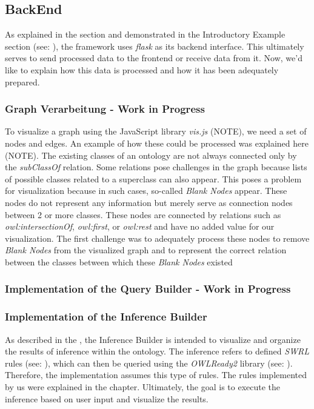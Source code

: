\subsection{BackEnd}

As explained in the  section and demonstrated in the Introductory Example section (see: ), the framework uses \textit{flask} as its backend interface. 
This ultimately serves to send processed data to the frontend or receive data from it. Now, we'd like to explain how this data is processed and how it has been adequately prepared.
\subsubsection{Graph Verarbeitung - Work in Progress}

To visualize a graph using the JavaScript library \textit{vis.js} (NOTE), we need a set of nodes and edges. An example of how these could be processed was explained here (NOTE). The existing classes of an ontology are not always connected only by the \textit{subClassOf} relation. Some relations pose challenges in the graph because lists of possible classes related to a superclass can also appear. This poses a problem for visualization because in such cases, so-called \textit{Blank Nodes} appear. These nodes do not represent any information but merely serve as connection nodes between 2 or more classes. These nodes are connected by relations such as \textit{owl:intersectionOf}, \textit{owl:first}, or \textit{owl:rest} and have no added value for our visualization. The first challenge was to adequately process these nodes to remove \textit{Blank Nodes} from the visualized graph and to represent the correct relation between the classes between which these \textit{Blank Nodes} existed

\subsubsection{Implementation of the Query Builder - Work in Progress}


\subsubsection{Implementation of the Inference Builder}
As described in the , the Inference Builder is intended to visualize and organize the results of inference within the ontology. 
The inference refers to defined \textit{SWRL} rules (see: ), which can then be queried using the \textit{OWLReady2} library (see: ).
Therefore, the implementation assumes this type of rules. The rules implemented by us were explained in the  chapter. 
Ultimately, the goal is to execute the inference based on user input and visualize the results.
